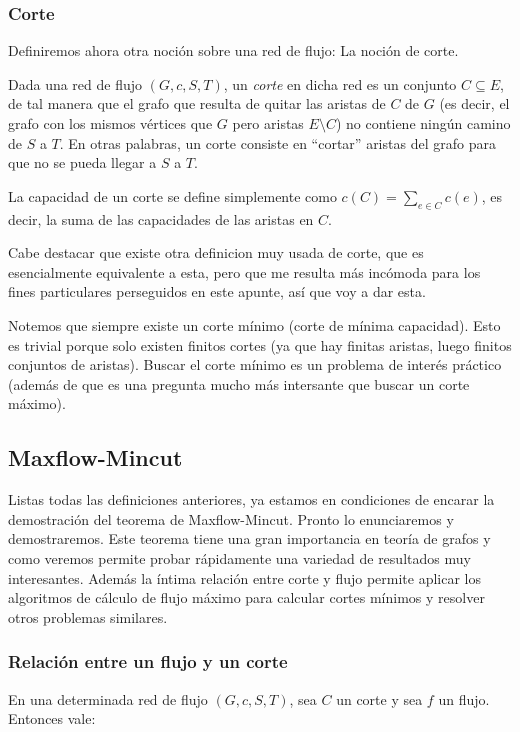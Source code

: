 \documentclass{article}
\begin{document}
\subsubsection{Corte}

Definiremos ahora otra noción sobre una red de flujo: La noción de corte.

Dada una red de flujo $(G,c,S,T)$, un \textit{corte} en dicha red es un conjunto $C \subseteq E$, de tal manera que el grafo que resulta de quitar
las aristas de $C$ de $G$ (es decir, el grafo con los mismos vértices que $G$ pero aristas $E \setminus C$) no contiene ningún camino de $S$ a $T$.
En otras palabras, un corte consiste en ``cortar'' aristas del grafo para que no se pueda llegar a $S$ a $T$.

La capacidad de un corte se define simplemente como $c(C) = \sum_{e \in C}{c(e)}$, es decir, la suma de las capacidades de las aristas en $C$.

Cabe destacar que existe otra definicion muy usada de corte, que es esencialmente equivalente a esta, pero que me resulta más incómoda para los
fines particulares perseguidos en este apunte, así que voy a dar esta.

Notemos que siempre existe un corte mínimo (corte de mínima capacidad). Esto es trivial porque solo existen finitos cortes (ya que hay finitas aristas,
luego finitos conjuntos de aristas). Buscar el corte mínimo es un problema de interés práctico (además de que es una pregunta mucho más intersante
que buscar un corte máximo).

\subsection{Maxflow-Mincut}

Listas todas las definiciones anteriores, ya estamos en condiciones de encarar la demostración del teorema de Maxflow-Mincut. Pronto lo enunciaremos
y demostraremos. Este teorema tiene una gran importancia en teoría de grafos y como veremos permite probar rápidamente una variedad de resultados
muy interesantes. Además la íntima relación entre corte y flujo permite aplicar los algoritmos de cálculo de flujo máximo para calcular cortes mínimos
y resolver otros problemas similares.

\subsubsection{Relación entre un flujo y un corte}

En una determinada red de flujo $(G,c,S,T)$, sea $C$ un corte y sea $f$ un flujo. Entonces vale:
\end{document}
